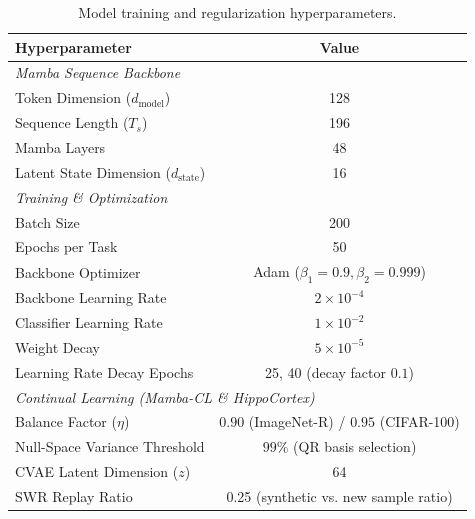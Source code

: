 \begin{table}[ht]
    \centering
    \caption{Model training and regularization hyperparameters.}
    \label{tab:app_hyperparams}
    \begin{tabular}{lc}
        \toprule
        \textbf{Hyperparameter} & \textbf{Value} \\
        \midrule
        \multicolumn{2}{l}{\textit{Mamba Sequence Backbone}} \\
        Token Dimension ($d_{\text{model}}$) & 128 \\
        Sequence Length ($T_s$) & 196 \\
        Mamba Layers & 48 \\
        Latent State Dimension ($d_{\text{state}}$) & 16 \\
        \midrule
        \multicolumn{2}{l}{\textit{Training \& Optimization}} \\
        Batch Size & 200 \\
        Epochs per Task & 50 \\
        Backbone Optimizer & Adam ($\beta_1=0.9, \beta_2=0.999$) \\
        Backbone Learning Rate & $2 \times 10^{-4}$ \\
        Classifier Learning Rate & $1 \times 10^{-2}$ \\
        Weight Decay & $5 \times 10^{-5}$ \\
        Learning Rate Decay Epochs & 25, 40 (decay factor $0.1$) \\
        \midrule
        \multicolumn{2}{l}{\textit{Continual Learning (Mamba-CL \& HippoCortex)}} \\
        Balance Factor ($\eta$) & $0.90$ (ImageNet-R) / $0.95$ (CIFAR-100) \\
        Null-Space Variance Threshold & $99\%$ (QR basis selection) \\
        CVAE Latent Dimension ($z$) & 64 \\
        SWR Replay Ratio & 0.25 (synthetic vs. new sample ratio) \\
        \bottomrule
    \end{tabular}
\end{table}

